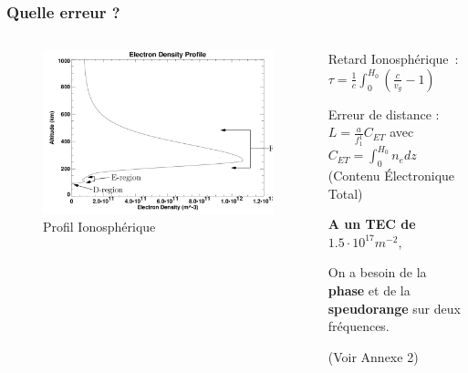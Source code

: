 \documentclass[xcolor=dvipsnames,envcountsect]{beamer}
\begin{document}
\begin{frame}
	\frametitle{Quelle erreur ?}
	\justifying
		\begin{columns}
			\begin{column}{0.5\textwidth}
				\begin{figure}
					\centering
					\includegraphics[width=1\textwidth]{./Figures/iono_profil.png}
					\caption {Profil Ionosphérique \cite{ionoprofil}}
				\end{figure}
			\end{column}
			\begin{column}{0.5\textwidth}

				Retard Ionosphérique : \\
				$\tau = \frac{1}{c} \int_{0}^{H_0} (\frac{c}{v_g}-1)$ \newline

				Erreur de distance : \\
				$L = \frac{a}{f_1^1} C_{ET}$ avec $C_{ET} = \int_{0}^{H_0} n_e dz$ (Contenu Électronique Total)
				\newline

				\begin{center}
					\textbf{A un TEC de }$1.5\cdot 10^{17} m^{-2}$, 
				\end{center}

				On a besoin de la \textbf{phase} et de la \textbf{speudorange} sur deux fréquences.
				\begin{flushright}
					\tiny{(Voir Annexe 2)}
				\end{flushright}
			\end{column}
		\end{columns}
\end{frame}
\end{document}
